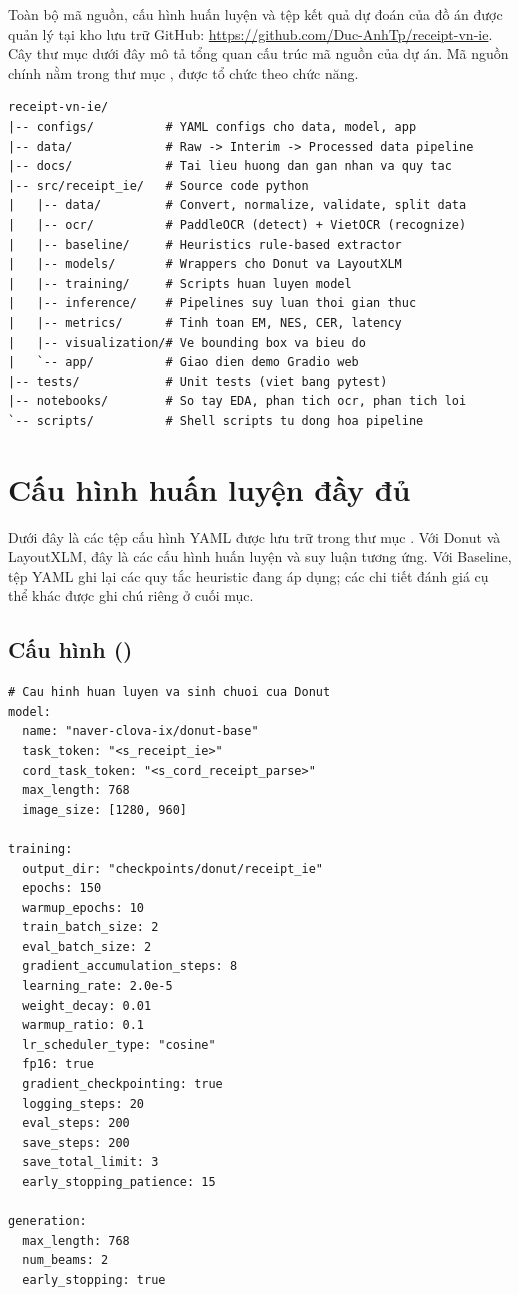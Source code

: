 Toàn bộ mã nguồn, cấu hình huấn luyện và tệp kết quả dự đoán của đồ án được quản lý tại kho lưu trữ GitHub: \url{https://github.com/Duc-AnhTp/receipt-vn-ie}. Cây thư mục dưới đây mô tả tổng quan cấu trúc mã nguồn của dự án. Mã nguồn chính nằm trong thư mục , được tổ chức theo chức năng.

\begin{lstlisting}[caption={Cấu trúc thư mục dự án}, label={lst:project-tree}]
receipt-vn-ie/
|-- configs/          # YAML configs cho data, model, app
|-- data/             # Raw -> Interim -> Processed data pipeline
|-- docs/             # Tai lieu huong dan gan nhan va quy tac
|-- src/receipt_ie/   # Source code python
|   |-- data/         # Convert, normalize, validate, split data
|   |-- ocr/          # PaddleOCR (detect) + VietOCR (recognize)
|   |-- baseline/     # Heuristics rule-based extractor
|   |-- models/       # Wrappers cho Donut va LayoutXLM
|   |-- training/     # Scripts huan luyen model
|   |-- inference/    # Pipelines suy luan thoi gian thuc
|   |-- metrics/      # Tinh toan EM, NES, CER, latency
|   |-- visualization/# Ve bounding box va bieu do
|   `-- app/          # Giao dien demo Gradio web
|-- tests/            # Unit tests (viet bang pytest)
|-- notebooks/        # So tay EDA, phan tich ocr, phan tich loi
`-- scripts/          # Shell scripts tu dong hoa pipeline
\end{lstlisting}


\newpage
\section{Cấu hình huấn luyện đầy đủ}
\label{appendix:configs}

Dưới đây là các tệp cấu hình YAML được lưu trữ trong thư mục . Với Donut và LayoutXLM, đây là các cấu hình huấn luyện và suy luận tương ứng. Với Baseline, tệp YAML ghi lại các quy tắc heuristic đang áp dụng; các chi tiết đánh giá cụ thể khác được ghi chú riêng ở cuối mục.

\subsection{Cấu hình  ()}
\label{appendix:config-donut}

\begin{lstlisting}[style=yaml, caption={Cấu hình huấn luyện \model{Donut}}, label={lst:config-donut}]
# Cau hinh huan luyen va sinh chuoi cua Donut
model:
  name: "naver-clova-ix/donut-base"
  task_token: "<s_receipt_ie>"
  cord_task_token: "<s_cord_receipt_parse>"
  max_length: 768
  image_size: [1280, 960]

training:
  output_dir: "checkpoints/donut/receipt_ie"
  epochs: 150
  warmup_epochs: 10
  train_batch_size: 2
  eval_batch_size: 2
  gradient_accumulation_steps: 8
  learning_rate: 2.0e-5
  weight_decay: 0.01
  warmup_ratio: 0.1
  lr_scheduler_type: "cosine"
  fp16: true
  gradient_checkpointing: true
  logging_steps: 20
  eval_steps: 200
  save_steps: 200
  save_total_limit: 3
  early_stopping_patience: 15

generation:
  max_length: 768
  num_beams: 2
  early_stopping: true
\end{lstlisting}

